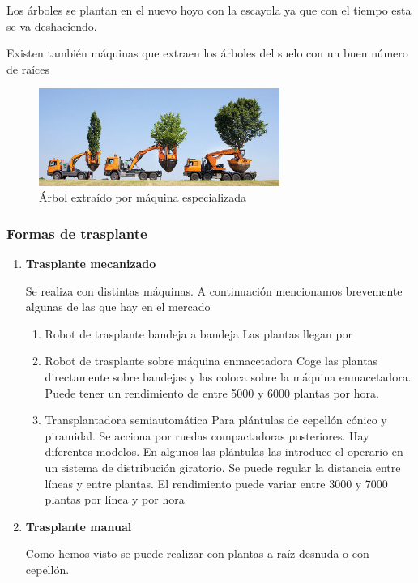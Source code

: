 \documentclass[a4paper,12pt,oneside]{article}
\begin{document}
\begin{enumerate}
\begin{enumerate}
Los árboles se plantan en el nuevo hoyo con la escayola ya que con el tiempo
esta se va deshaciendo.

Existen también máquinas que extraen los árboles del suelo con un buen número de
raíces  

\begin{figure}[htbp]
\centering
\includegraphics[width=0.7\textwidth]{./img_uf1596/arbol_transplante_maquina.jpg}
\caption{Árbol extraído por máquina especializada}
\end{figure}
\end{enumerate}
\end{enumerate}

\subsubsection{Formas de trasplante}
\label{sec:orga83e346}

\begin{enumerate}
\item \textbf{Trasplante mecanizado}
\label{sec:orgc3de38d}

Se realiza con distintas máquinas. A continuación mencionamos brevemente algunas
de las que hay en el mercado

\begin{enumerate}
\item Robot de trasplante bandeja a bandeja
\label{sec:org32da8ed}
Las plantas llegan por     
\item Robot de trasplante sobre máquina enmacetadora
\label{sec:org2532046}
Coge las plantas directamente sobre bandejas y las coloca sobre la máquina enmacetadora. Puede tener un rendimiento de entre 5000 y 6000 plantas por hora.
\item Transplantadora semiautomática
\label{sec:org02c8776}
Para plántulas de cepellón cónico y piramidal. Se acciona por ruedas compactadoras posteriores. Hay diferentes modelos. En algunos las plántulas las introduce el operario en un sistema de distribución giratorio. Se puede regular la distancia entre líneas y entre plantas. El rendimiento puede variar entre 3000 y 7000 plantas por línea y por hora
\end{enumerate}
\item \textbf{Trasplante manual}
\label{sec:org8936c5b}

Como hemos visto se puede realizar con plantas a raíz desnuda o con cepellón.
\end{enumerate}
\end{document}

